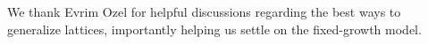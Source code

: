 \begin{credits}
	\subsubsection{\ackname} We thank Evrim Ozel for helpful discussions
	regarding the best ways to generalize lattices, importantly helping us
	settle on the fixed-growth model.
\end{credits}